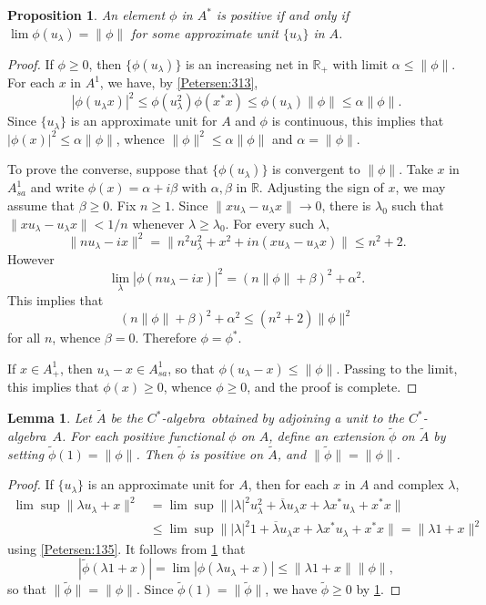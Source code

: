 \documentclass{book}
\newtheorem{lemma}[definition]{Lemma}
\newtheorem{proposition}[definition]{Proposition}
\def\cstar{\(C^*\)-algebra}
\begin{document}
\begin{proposition}\label{Petersen:314}
  An element \(\phi\) in \(A^*\) is positive if and only if \(\lim\phi(u_\lambda)=\|\phi\|\)
  for some approximate unit \(\{u_\lambda\}\) in \(A\).
\end{proposition}
\begin{proof}
  If \(\phi\geq0\), then \(\{\phi(u_\lambda)\}\) is an increasing net in \(\mathbb{R}_+\) with limit \(\alpha\leq\|\phi\|\).
  For each \(x\) in \(A^1\), we have, by \ref{Petersen:313},
  \[
    |\phi(u_\lambda x)|^2\leq\phi(u_\lambda^2)\phi(x^* x)\leq\phi(u_\lambda)\|\phi\|\leq\alpha\|\phi\|.
  \]
  Since \(\{u_\lambda\}\) is an approximate unit for \(A\) and \(\phi\) is continuous, this implies that
  \(|\phi(x)|^2\leq\alpha\|\phi\|\), whence \(\|\phi\|^2\leq\alpha\|\phi\|\) and \(\alpha=\|\phi\|\).\par
  To prove the converse, suppose that \(\{\phi(u_\lambda)\}\) is convergent to \(\|\phi\|\).
  Take \(x\) in \(A_{sa}^1\) and write \(\phi(x)=\alpha+i\beta\) with \(\alpha,\beta\) in \(\mathbb{R}\).
  Adjusting the sign of \(x\), we may assume that \(\beta\geq 0\). Fix \(n\geq1\). Since
  \(\|xu_\lambda-u_\lambda x\|\to0\), there is \(\lambda_0\) such that
  \(\|xu_\lambda-u_\lambda x\|<1/n\) whenever \(\lambda\geq\lambda_0\). For every such \(\lambda\),
  \[
    \|nu_\lambda-ix\|^2=\|n^2u_\lambda^2+x^2+in(xu_\lambda-u_\lambda x)\|\leq n^2+2.
  \]
  However
  \[
    \lim_{\lambda}|\phi(nu_\lambda-ix)|^2=(n\|\phi\|+\beta)^2+\alpha^2.
  \]
  This implies that
  \[
    (n\|\phi\|+\beta)^2+\alpha^2\leq(n^2+2)\|\phi\|^2
  \]
  for all \(n\), whence \(\beta=0\). Therefore \(\phi=\phi^*\).\par
  If \(x\in A^1_+\), then \(u_\lambda-x\in A_{sa}^1\), so that \(\phi(u_\lambda-x)\leq\|\phi\|\).
  Passing to the limit, this implies that \(\phi(x)\geq 0\), whence \(\phi\geq 0\), and the proof is complete.
\end{proof}
\begin{lemma}\label{Petersen:315}
  Let \(\tilde{A}\) be the \cstar\ obtained by adjoining a unit to the \cstar\ \(A\).
  For each positive functional \(\phi\) on \(A\), define an extension \(\tilde{\phi}\) on \(\tilde{A}\) by setting
  \(\tilde{\phi}(1)=\|\phi\|\). Then \(\tilde{\phi}\) is positive on \(\tilde{A}\), and \(\|\tilde{\phi}\|=\|\phi\|\).
\end{lemma}
\begin{proof}
  If \(\{u_\lambda\}\) is an approximate unit for \(A\), then for each \(x\) in \(A\) and complex \(\lambda\),
  \begin{align*}
    \lim\sup\|\lambda u_\lambda+x\|^2&=\lim\sup\||\lambda|^2u_\lambda^2+\overline{\lambda}u_\lambda x+\lambda x^* u_\lambda+x^* x\|\\
    &\leq\lim\sup\||\lambda|^2 1+\overline{\lambda}u_\lambda x+\lambda x^* u_\lambda+x^* x\|=\|\lambda 1+x\|^2
  \end{align*}
  using \ref{Petersen:135}. It follows from \ref{Petersen:314} that
  \[
    |\tilde{\phi}(\lambda 1+x)|=\lim|\phi(\lambda u_\lambda+x)|\leq\|\lambda1+x\|\|\phi\|,
  \]
  so that \(\|\tilde{\phi}\|=\|\phi\|\). Since \(\tilde{\phi}(1)=\|\tilde{\phi}\|\), we have \(\tilde{\phi}\geq0\) by \ref{Petersen:314}.
\end{proof}
\end{document}
